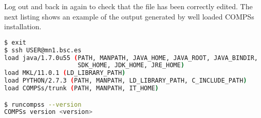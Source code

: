 Log out and back in again to check that the file has been correctly edited. The next listing shows an example of the
output generated by well loaded COMPSs installation. 
\begin{lstlisting}[language=bash]
$ exit
$ ssh USER@mn1.bsc.es
load java/1.7.0u55 (PATH, MANPATH, JAVA_HOME, JAVA_ROOT, JAVA_BINDIR, 
                    SDK_HOME, JDK_HOME, JRE_HOME)
load MKL/11.0.1 (LD_LIBRARY_PATH)
load PYTHON/2.7.3 (PATH, MANPATH, LD_LIBRARY_PATH, C_INCLUDE_PATH)
load COMPSs/trunk (PATH, MANPATH, IT_HOME)

$ runcompss --version
COMPSs version <version>
\end{lstlisting}


